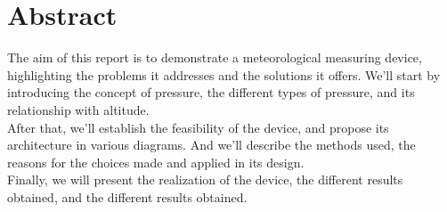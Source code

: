 \vspace{-2cm} 

\chapter*{Abstract}

The aim of this report is to demonstrate a meteorological measuring device, highlighting the problems it addresses and the solutions it offers. We'll start by introducing the concept of pressure, the different types of pressure, and its relationship with altitude.\\

After that, we'll establish the feasibility of the device, and propose its architecture in various diagrams. And we'll describe the methods used, the reasons for the choices made and applied in its design.\\

Finally, we will present the realization of the device, the different results obtained, and the different results obtained.  

